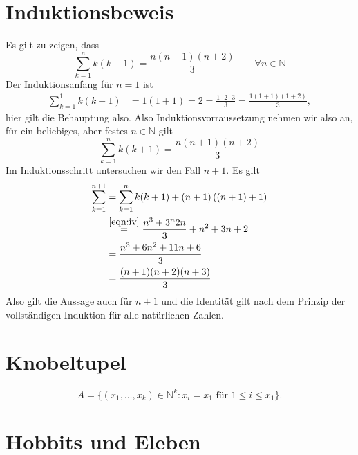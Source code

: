 \documentclass[a4paper]{article}
\begin{document}
\section{Induktionsbeweis}
Es gilt zu zeigen, dass
$$
\sum_{k=1}^n k(k+1) = \frac{n(n+1)(n+2)}{3} \qquad ∀n\in ℕ$$
Der Induktionsanfang für $n=1$ ist
\begin{align*}
    \sum_{k=1}^1 k(k+1) &= 1 (1+1) = 2 = \frac{1\cdot 2 \cdot 3}{3} = \frac{ 1(1+1)(1+2) }{3},
\end{align*}
hier gilt die Behauptung also. Also Induktionsvorraussetzung nehmen wir also an, für ein beliebiges, aber festes $n\in ℕ$ gilt
\begin{equation}\label{eqn:iv}
\sum_{k=1}^n k(k+1) = \frac{n(n+1)(n+2)}{3}\tag{$\star$}
\end{equation}
Im Induktionsschritt untersuchen wir den Fall $n+1$.
Es gilt
\begin{align*}
    \sum_{k=1}^{n+1} &= \sum_{k=1}^n k(k+1) + (n+1)\left( (n+1) + 1 \right) \\
    &\stackrel{\eqref{eqn:iv}}= \frac{n^3 + 3^n 2n}{3} + n^2 + 3n +2\\
    &= \frac{n^3 + 6n^2 + 11 n + 6}{3} \\
    &= \frac{(n+1) (n+2)(n+3) }{3}
\end{align*}
Also gilt die Aussage auch für $n+1$ und die Identität gilt nach dem Prinzip der vollständigen Induktion für alle natürlichen Zahlen.

\section{Knobeltupel}
$$A= \{ (x_1,…, x_k) \in ℕ^k: x_i = x_1\text{ für } 1\le i \le x_1 \}.$$

\setcounter{section}{6}
\section{Hobbits und Eleben}
\end{document}
